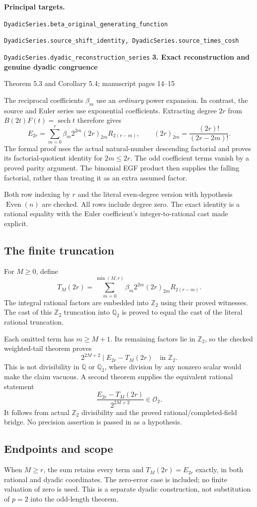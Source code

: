 \documentclass[11pt]{article}
\newcommand{\Q}{\mathbb Q}\newcommand{\Z}{\mathbb Z}\newcommand{\N}{\mathbb N}
\newcommand{\target}[1]{{\footnotesize\texttt{#1}}}
\newcommand{\pageheading}[2]{{\Large\bfseries\color{ink}#1}\par{\small #2}\par\medskip}
\newcommand{\sech}{\operatorname{sech}}
\newcommand{\fall}[2]{(#1)_{#2}}
\begin{document}
\textbf{Principal targets.}\par
\target{DyadicSeries.beta\_original\_generating\_function}\par
\target{DyadicSeries.source\_shift\_identity, DyadicSeries.source\_times\_cosh}\par
\target{DyadicSeries.dyadic\_reconstruction\_series}
\newpage
\pageheading{3. Exact reconstruction and genuine dyadic congruence}{Theorem 5.3 and Corollary 5.4; manuscript pages 14--15}
The reciprocal coefficients $\beta_m$ use an \emph{ordinary} power expansion. In contrast, the source and Euler series use exponential coefficients. Extracting degree $2r$ from $B(2t)F(t)=\sech t$ therefore gives
\[
 \boxed{E_{2r}=\sum_{m=0}^{r}\beta_m2^{2m}\fall{2r}{2m}R_{2(r-m)},}
 \qquad
 \fall{2r}{2m}=\frac{(2r)!}{(2r-2m)!}.
\]
The formal proof uses the actual natural-number descending factorial and proves its factorial-quotient identity for $2m\leq2r$. The odd coefficient terms vanish by a proved parity argument. The binomial EGF product then supplies the falling factorial, rather than treating it as an extra assumed factor.

Both row indexing by $r$ and the literal even-degree version with hypothesis $\operatorname{Even}(n)$ are checked. All rows include degree zero. The exact identity is a rational equality with the Euler coefficient's integer-to-rational cast made explicit.

\subsection*{The finite truncation}
For $M\geq0$, define
\[
 T_M(2r)=\sum_{m=0}^{\min(M,r)}\beta_m2^{2m}\fall{2r}{2m}R_{2(r-m)}.
\]
The integral rational factors are embedded into $\Z_2$ using their proved witnesses. The cast of this $\Z_2$ truncation into $\Q_2$ is proved to equal the cast of the literal rational truncation.

Each omitted term has $m\geq M+1$. Its remaining factors lie in $\Z_2$, so the checked weighted-tail theorem proves
\[
 \boxed{2^{2M+2}\mid E_{2r}-T_M(2r)\quad\text{in }\Z_2.}
\]
This is not divisibility in $\Q$ or $\Q_2$, where division by any nonzero scalar would make the claim vacuous. A second theorem supplies the equivalent rational statement
\[
 \boxed{\frac{E_{2r}-T_M(2r)}{2^{2M+2}}\in\mathcal O_2.}
\]
It follows from actual $\Z_2$ divisibility and the proved rational/completed-field bridge. No precision assertion is passed in as a hypothesis.

\subsection*{Endpoints and scope}
When $M\geq r$, the sum retains every term and $T_M(2r)=E_{2r}$ exactly, in both rational and dyadic coordinates. The zero-error case is included; no finite valuation of zero is used. This is a separate dyadic construction, not substitution of $p=2$ into the odd-length theorem.
\end{document}
